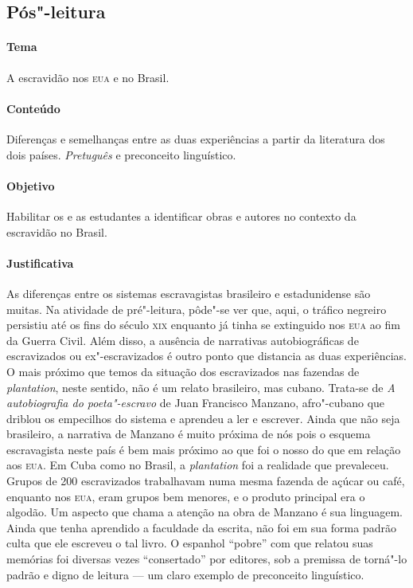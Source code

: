 \documentclass[11pt]{extarticle}
\begin{document}
\subsection{Pós"-leitura}

\paragraph{Tema} A escravidão nos \textsc{eua} e no Brasil.

\paragraph{Conteúdo} Diferenças e semelhanças entre as duas experiências a partir da
literatura dos dois países. \textit{Pretuguês} e preconceito linguístico.

\paragraph{Objetivo} Habilitar os e as estudantes a identificar obras e autores no contexto
da escravidão no Brasil. 


\paragraph{Justificativa} As diferenças entre os sistemas escravagistas brasileiro e estadunidense são
muitas. Na atividade de pré"-leitura, pôde"-se ver que, aqui, o tráfico negreiro persistiu até
os fins do século \textsc{xix} enquanto já tinha se extinguido nos \textsc{eua} ao fim da Guerra Civil. 
Além disso, a ausência de narrativas autobiográficas de escravizados ou ex"-escravizados é outro
ponto que distancia as duas experiências. O mais próximo que temos da situação dos escravizados 
nas fazendas de \textit{plantation}, neste sentido, não é um relato brasileiro, mas cubano. 
Trata-se de \textit{A autobiografia do poeta"-escravo} de Juan Francisco Manzano, afro"-cubano que driblou
os empecilhos do sistema e aprendeu a ler e escrever. Ainda que não seja brasileiro,
a narrativa de Manzano é muito próxima de nós pois o esquema escravagista neste país é bem
mais próximo ao que foi o nosso do que em relação aos \textsc{eua}. Em Cuba como no Brasil, a 
\textit{plantation} foi a realidade que prevaleceu. Grupos de 200 escravizados trabalhavam numa
mesma fazenda de açúcar ou café, enquanto nos \textsc{eua}, eram grupos bem menores, e o produto
principal era o algodão. 
Um aspecto que chama a atenção na obra de Manzano é sua linguagem. Ainda que tenha aprendido
a faculdade da escrita, não foi em sua forma padrão culta que ele escreveu o tal livro.
O espanhol ``pobre'' com que relatou suas memórias foi diversas vezes ``consertado'' por
editores, sob a premissa de torná"-lo padrão e digno de leitura --- um claro exemplo
de preconceito linguístico.
\end{document}
